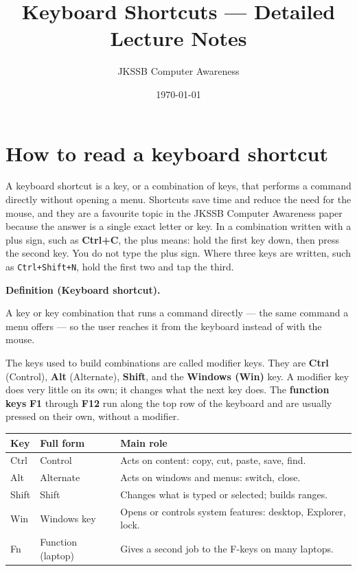\documentclass[11pt]{article}
\title{Keyboard Shortcuts --- Detailed Lecture Notes}
\author{JKSSB Computer Awareness}
\date{\today}
\newenvironment{definitionbox}[1]{%
  \par\noindent\textbf{Definition (#1).}\ \itshape
}{\par\vspace{0.3em}}
\begin{document}
\maketitle

\section{How to read a keyboard shortcut}
A keyboard shortcut is a key, or a combination of keys, that performs a
command directly without opening a menu. Shortcuts save time and reduce the
need for the mouse, and they are a favourite topic in the JKSSB Computer
Awareness paper because the answer is a single exact letter or key. In a
combination written with a plus sign, such as \textbf{Ctrl+C}, the plus means:
hold the first key down, then press the second key. You do not type the plus
sign. Where three keys are written, such as \texttt{Ctrl+Shift+N}, hold the
first two and tap the third.

\begin{definitionbox}{Keyboard shortcut}
A key or key combination that runs a command directly --- the same command a
menu offers --- so the user reaches it from the keyboard instead of with the
mouse.
\end{definitionbox}

The keys used to build combinations are called modifier keys. They are
\textbf{Ctrl} (Control), \textbf{Alt} (Alternate), \textbf{Shift}, and the
\textbf{Windows (Win)} key. A modifier key does very little on its own; it
changes what the next key does. The \textbf{function keys} \textbf{F1} through
\textbf{F12} run along the top row of the keyboard and are usually pressed on
their own, without a modifier.

\begin{center}
\begin{tabular}{p{}p{}p{}}
\toprule
\textbf{Key} & \textbf{Full form} & \textbf{Main role} \\
\midrule
Ctrl & Control & Acts on content: copy, cut, paste, save, find. \\
Alt & Alternate & Acts on windows and menus: switch, close. \\
Shift & Shift & Changes what is typed or selected; builds ranges. \\
Win & Windows key & Opens or controls system features: desktop, Explorer, lock. \\
Fn & Function (laptop) & Gives a second job to the F-keys on many laptops. \\
\bottomrule
\end{tabular}
\end{center}
\end{document}
